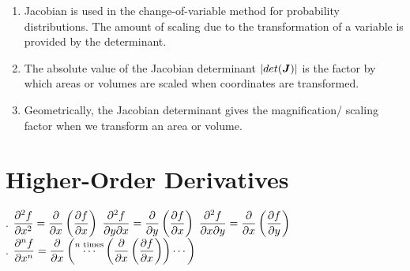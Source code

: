\begin{enumerate}
\begin{enumerate}
        \item Jacobian is used in the change-of-variable method for probability distributions.
        The amount of scaling due to the transformation of a variable is provided by the determinant.
        \hfill \cite{mfml/book/mml/Deisenroth-Faisal-Ong}

        \item The absolute value of the Jacobian determinant $\left| det(\bm{J}) \right|$ is the factor by which areas or volumes are scaled when coordinates are transformed.
        \hfill \cite{mfml/book/mml/Deisenroth-Faisal-Ong}

        \item Geometrically, the Jacobian determinant gives the magnification/ scaling factor when we transform an area or volume.
        \hfill \cite{mfml/book/mml/Deisenroth-Faisal-Ong}
    \end{enumerate}

\end{enumerate}







\section{Higher-Order Derivatives}

.\hfill
$
    \dfrac{\partial^2 f}{\partial x^2} = \dfrac{\partial}{\partial x} \left(\dfrac{\partial f}{\partial x}\right)
$
\hfill \vrule \hfill
$
    \dfrac{\partial^2 f}{\partial y \partial x} = \dfrac{\partial}{\partial y} \left(\dfrac{\partial f}{\partial x}\right)
$
\hfill \vrule \hfill
$
    \dfrac{\partial^2 f}{\partial x \partial y} = \dfrac{\partial}{\partial x} \left(\dfrac{\partial f}{\partial y}\right)
$
\hfill \cite{mfml/book/mml/Deisenroth-Faisal-Ong}
\\[0.2cm]
.\hfill
$
    \dfrac{\partial^n f}{\partial x^n} =
    \dfrac{\partial}{\partial x} \left(
        \overset{n \text{ times}}{\cdots}
        \left(\dfrac{\partial}{\partial x} \left(\dfrac{\partial f}{\partial x}\right)\right)
        \cdots
    \right)
$
\hfill \cite{mfml/book/mml/Deisenroth-Faisal-Ong}

